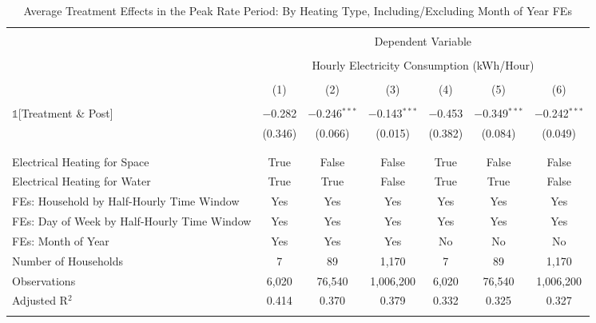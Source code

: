 
\begin{table}[!htbp] \centering 
  \caption{Average Treatment Effects in the Peak Rate Period: By Heating Type, Including/Excluding Month of Year FEs} 
  \label{Table:Average-Treatment-Effects-in-the-Peak-Rate-Period_By-Heating-Type_Model-without-Interaction-Terms_Month-of-Year-FEs} 
\small 
\begin{tabular}{@{\extracolsep{20pt}}lcccccc} 
\\[-1.8ex]\hline 
\hline \\[-1.8ex] 
 & \multicolumn{6}{c}{Dependent Variable} \\ 
\cline{2-7} 
\\[-1.8ex] & \multicolumn{6}{c}{Hourly Electricity Consumption  (kWh/Hour)} \\ 
\\[-1.8ex] & (1) & (2) & (3) & (4) & (5) & (6)\\ 
\hline \\[-1.8ex] 
 $\mathbb{1}$[Treatment \& Post] & $-$0.282 & $-$0.246$^{***}$ & $-$0.143$^{***}$ & $-$0.453 & $-$0.349$^{***}$ & $-$0.242$^{***}$ \\ 
  & (0.346) & (0.066) & (0.015) & (0.382) & (0.084) & (0.049) \\ 
  & & & & & & \\ 
\hline \\[-1.8ex] 
Electrical Heating for Space & True & False & False & True & False & False \\ 
Electrical Heating for Water & True & True & False & True & True & False \\ 
FEs: Household by Half-Hourly Time Window & Yes & Yes & Yes & Yes & Yes & Yes \\ 
FEs: Day of Week by Half-Hourly Time Window & Yes & Yes & Yes & Yes & Yes & Yes \\ 
FEs: Month of Year & Yes & Yes & Yes & No & No & No \\ 
Number of Households &     7 &    89 & 1,170 &     7 &    89 & 1,170 \\ 
Observations & 6,020 & 76,540 & 1,006,200 & 6,020 & 76,540 & 1,006,200 \\ 
Adjusted R$^{2}$ & 0.414 & 0.370 & 0.379 & 0.332 & 0.325 & 0.327 \\ 
\hline 
\hline \\[-1.8ex] 
\end{tabular} 
\end{table} 
